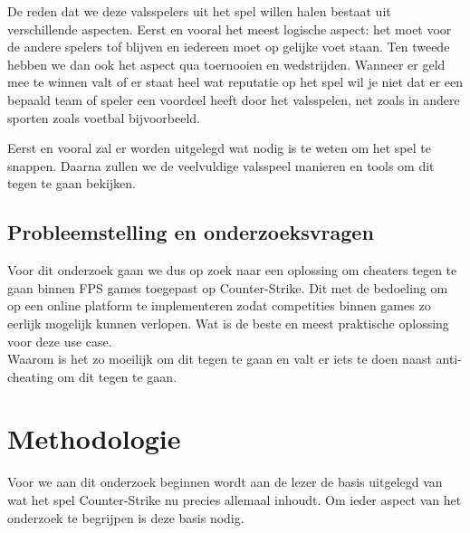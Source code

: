 \documentclass[pdftex,a4paper,12pt,twoside]{report}
\begin{document}
De reden dat we deze valsspelers uit het spel willen halen bestaat uit verschillende aspecten. Eerst en vooral het meest logische aspect: het moet voor de andere spelers tof blijven en iedereen moet op gelijke voet staan. Ten tweede hebben we dan ook het aspect qua toernooien en wedstrijden. Wanneer er geld mee te winnen valt of er staat heel wat reputatie op het spel wil je niet dat er een bepaald team of speler een voordeel heeft door het valsspelen, net zoals in andere sporten zoals voetbal bijvoorbeeld. 

Eerst en vooral zal er worden uitgelegd wat nodig is te weten om het spel te snappen. Daarna zullen we de veelvuldige valsspeel manieren en tools om dit tegen te gaan bekijken.


\section{Probleemstelling en onderzoeksvragen}
\label{sec:onderzoeksvragen}

Voor dit onderzoek gaan we dus op zoek naar een oplossing om cheaters tegen te gaan binnen FPS games toegepast op Counter-Strike. Dit met de bedoeling om op een online platform te implementeren zodat competities binnen games zo eerlijk mogelijk kunnen verlopen. Wat is de beste en meest praktische oplossing voor deze use case. 
\\

Waarom is het zo moeilijk om dit tegen te gaan en valt er iets te doen naast anti-cheating om dit tegen te gaan.


\chapter{Methodologie}
\label{ch:methodologie}

Voor we aan dit onderzoek beginnen wordt aan de lezer de basis uitgelegd van wat het spel Counter-Strike nu precies allemaal inhoudt. Om ieder aspect van het onderzoek te begrijpen is deze basis nodig. 
\end{document}
